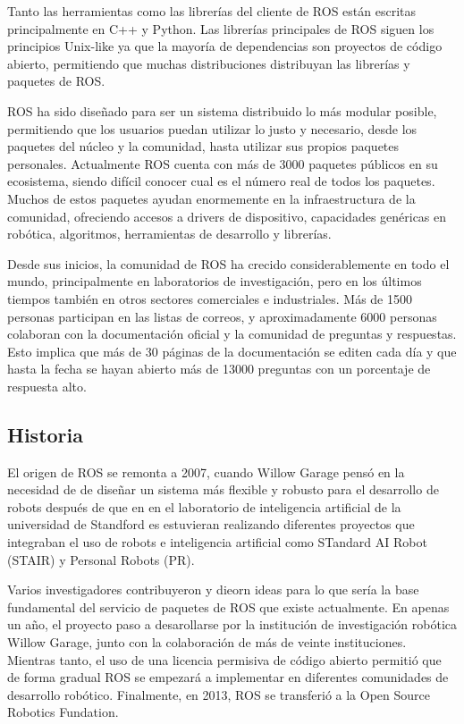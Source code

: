Tanto las herramientas como las librerías del cliente de ROS están escritas
principalmente en C++ y Python. Las librerías principales de ROS siguen los
principios Unix-like ya que la mayoría de dependencias son proyectos de código
abierto, permitiendo que muchas distribuciones distribuyan las librerías y
paquetes de ROS.

ROS ha sido diseñado para ser un sistema distribuido lo más modular posible,
permitiendo que los usuarios puedan utilizar lo justo y necesario, desde los
paquetes del núcleo y la comunidad, hasta utilizar sus propios paquetes
personales. Actualmente ROS cuenta con más de 3000 paquetes públicos en su
ecosistema, siendo difícil conocer cual es el número real de todos los paquetes.
Muchos de estos paquetes ayudan enormemente en la infraestructura de la
comunidad, ofreciendo accesos a drivers de dispositivo, capacidades genéricas en
robótica, algoritmos, herramientas de desarrollo y librerías.

Desde sus inicios, la comunidad de ROS ha crecido considerablemente en todo el
mundo, principalmente en laboratorios de investigación, pero en los últimos
tiempos también en otros sectores comerciales e industriales. Más de 1500
personas participan en las listas de correos, y aproximadamente 6000 personas
colaboran con la documentación oficial y la comunidad de preguntas y respuestas.
Esto implica que más de 30 páginas de la documentación se editen cada día y que
hasta la fecha se hayan abierto más de 13000 preguntas con un porcentaje de
respuesta alto.

\subsection{Historia}

El origen de ROS se remonta a 2007, cuando Willow Garage pensó en la necesidad
de de diseñar un sistema más flexible y robusto para el desarrollo de robots
después de que en en el laboratorio de inteligencia artificial de la universidad
de Standford es estuvieran realizando diferentes proyectos que integraban el uso
de robots e inteligencia artificial como STandard AI Robot (STAIR) y Personal
Robots (PR).

Varios investigadores contribuyeron y dieorn ideas para lo que sería la base
fundamental del servicio de paquetes de ROS que existe actualmente. En apenas un
año, el proyecto paso a desarollarse por la institución de investigación
robótica Willow Garage, junto con la colaboración de más de veinte
instituciones. Mientras tanto, el uso de una licencia permisiva de código
abierto permitió que de forma gradual ROS se empezará a implementar en
diferentes comunidades de desarrollo robótico. Finalmente, en 2013, ROS se
transferió a la Open Source Robotics Fundation.

